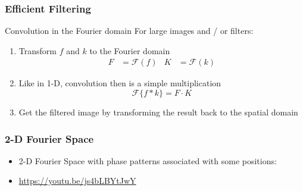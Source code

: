 \begin{frame}
    \frametitle{Efficient Filtering}
    \begin{block}{Convolution in the Fourier domain}
        For large images and /  or filters:
        \begin{enumerate}
            \item Transform $f$ and $k$ to the Fourier domain
                  \begin{align*}
                      F & =	\mathcal{F}(f) & K & = \mathcal{F}(k)
                  \end{align*}
            \item Like in 1-D, convolution then is a simple multiplication
                  \begin{equation*}
                      \mathcal{F}\lbrace f\ast k\rbrace = F\cdot K
                  \end{equation*}
            \item Get the filtered image by transforming the result back to the
                  spatial domain
        \end{enumerate}
    \end{block}

\end{frame}

\begin{frame}
	\frametitle{2-D Fourier Space}
	
	\begin{itemize}
		\item 2-D Fourier Space with phase patterns associated with some positions:
        \item \url{https://youtu.be/js4bLBYtJwY}
	\end{itemize}
	
	\vspace{-2ex}
	
	\begin{center}
		
	\end{center}
\end{frame}


